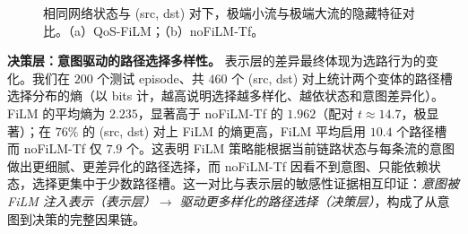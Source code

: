 \begin{figure}[t]
\centering
{}\hfill
{}
\caption{相同网络状态与 (src, dst) 对下，极端小流与极端大流的隐藏特征对比。（a）QoS-FiLM；（b）noFiLM-Tf。}
\label{fig:embedding_separation}
\end{figure}

\textbf{决策层：意图驱动的路径选择多样性。} 表示层的差异最终体现为选路行为的变化。我们在 $200$ 个测试 episode、共 $460$ 个 (src, dst) 对上统计两个变体的路径槽选择分布的熵（以 bits 计，越高说明选择越多样化、越依状态和意图差异化）。FiLM 的平均熵为 $2.235$，显著高于 noFiLM-Tf 的 $1.962$（配对 $t\!\approx\!14.7$，极显著）；在 $76\%$ 的 (src, dst) 对上 FiLM 的熵更高，FiLM 平均启用 $10.4$ 个路径槽而 noFiLM-Tf 仅 $7.9$ 个。这表明 FiLM 策略能根据当前链路状态与每条流的意图做出更细腻、更差异化的路径选择，而 noFiLM-Tf 因看不到意图、只能依赖状态，选择更集中于少数路径槽。这一对比与表示层的敏感性证据相互印证：\emph{意图被 FiLM 注入表示（表示层）$\to$ 驱动更多样化的路径选择（决策层）}，构成了从意图到决策的完整因果链。

